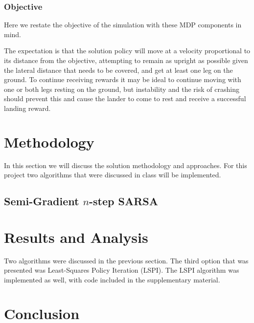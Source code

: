 \documentclass[journal]{IEEEtran}
\begin{document}
\subsubsection{Objective}
Here we restate the objective of the simulation with these MDP components in mind.

The expectation is that the solution policy will move at a velocity proportional to 
its distance from the objective, attempting to remain as upright as possible given the lateral
distance that needs to be covered, and get at least one leg on the ground.
To continue receiving rewards it may be ideal to continue moving with one or both legs resting on 
the ground, but instability and the risk of crashing should prevent this and cause the lander 
to come to rest and receive a successful landing reward.

\section{Methodology}
\label{sec:methodology}
In this section we will discuss the solution methodology and approaches.
For this project two algorithms that were discussed in class will be implemented.


\subsection{Semi-Gradient $n$-step SARSA}


\subsection{}

\section{Results and Analysis}
\label{sec:results}
Two algorithms were discussed in the previous section. 
The third option that was presented was Least-Squares Policy Iteration (LSPI).
The LSPI algorithm was implemented as well, with code included in the supplementary material.


\section{Conclusion}
\label{sec:conclusion}

\label{sec:references}
\printbibliography

\end{document}
